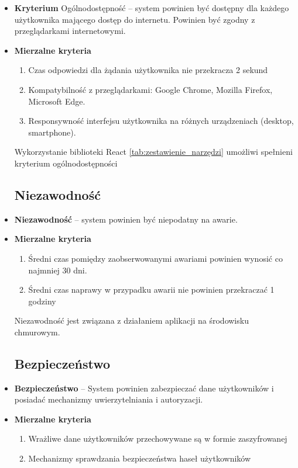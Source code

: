 \begin{itemize}
	\item \textbf{Kryterium} Ogólnodostępność -- system powinien być dostępny dla każdego użytkownika mającego dostęp do internetu. Powinien być zgodny z przeglądarkami internetowymi.
	\item \textbf{Mierzalne kryteria}
		\begin{enumerate}
			\item Czas odpowiedzi dla żądania użytkownika nie przekracza 2 sekund
			\item Kompatybilność z przeglądarkami: Google Chrome, Mozilla Firefox, Microsoft Edge.
			\item Responsywność interfejsu użytkownika na różnych urządzeniach (desktop, smartphone).
		\end{enumerate}
	Wykorzystanie biblioteki React \ref{tab:zestawienie_narzędzi} umożliwi spełnieni kryterium ogólnodostępności
		
\subsection{Niezawodność}
	\item \textbf{Niezawodność} -- system powinien być niepodatny na awarie.
	\item \textbf{Mierzalne kryteria}
		\begin{enumerate}
			\item Średni czas pomiędzy zaobserwowanymi awariami powinien wynosić co najmniej 30 dni.
			\item Średni czas naprawy w przypadku awarii nie powinien przekraczać 1 godziny
		\end{enumerate}
	Niezawodność jest związana z działaniem aplikacji na środowisku chmurowym. 
	
	\subsection{Bezpieczeństwo}
	
	\item \textbf{Bezpieczeństwo} -- System powinien zabezpieczać dane użytkowników i posiadać mechanizmy uwierzytelniania i autoryzacji.
	\item \textbf{Mierzalne kryteria}
		\begin{enumerate}
			\item Wrażliwe dane użytkowników przechowywane są w formie zaszyfrowanej
			\item Mechanizmy sprawdzania bezpieczeństwa haseł użytkowników
		\end{enumerate}
		

\end{itemize}
